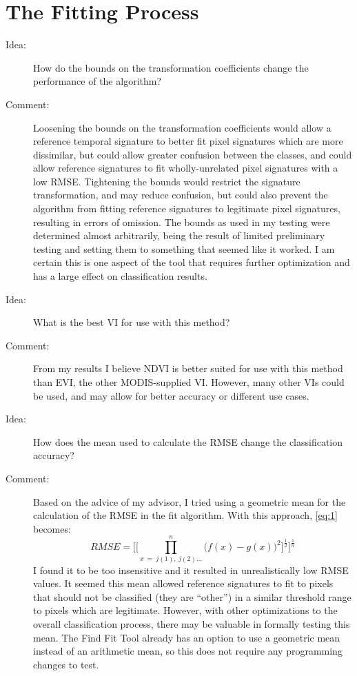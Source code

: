 \section{The Fitting Process}
\label{appendix:future:fitting}

\begin{description}
\item[Idea:] How do the bounds on the transformation coefficients change the performance of the algorithm?

\item[Comment:] Loosening the bounds on the transformation coefficients would allow a reference temporal signature to better fit pixel signatures which are more dissimilar, but could allow greater confusion between the classes, and could allow reference signatures to fit wholly-unrelated pixel signatures with a low RMSE. Tightening the bounds would restrict the signature transformation, and may reduce confusion, but could also prevent the algorithm from fitting reference signatures to legitimate pixel signatures, resulting in errors of omission. The bounds as used in my testing were determined  almost arbitrarily, being the result of limited preliminary testing and setting them to something that seemed like it worked. I am certain this is one aspect of the tool that requires further optimization and has a large effect on classification results.

\item[Idea:] What is the best VI for use with this method?

\item[Comment:] From my results I believe NDVI is better suited for use with this method than EVI, the other MODIS-supplied VI. However, many other VIs could be used, and may allow for better accuracy or different use cases.

\item[Idea:] How does the mean used to calculate the RMSE change the classification accuracy?

\item[Comment:] Based on the advice of my advisor, I tried using a geometric mean for the calculation of the RMSE in the fit algorithm. With this approach, \autoref{eq:1} becomes:
\begin{equation}
\label{eq:geometricmean}
  RMSE = \Biggl[\biggl[\prod_{x\ =\ j(1),\ j(2)\ldots}^{n}\bigl(f\left(x\right)-g\left(x\right)\bigr)^{2}\biggr]^{\frac{1}{2}}\Biggr]^{\frac{1}{n}}
\end{equation}
I found it to be too insensitive and it resulted in unrealistically low RMSE values. It seemed this mean allowed reference signatures to fit to pixels that should not be classified (they are ``other'') in a similar threshold range to pixels which are legitimate. However, with other optimizations to the overall classification process, there may be valuable in formally testing this mean. The Find Fit Tool already has an option to use a geometric mean instead of an arithmetic mean, so this does not require any programming changes to test.


\end{description}
